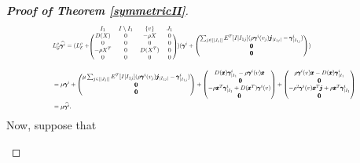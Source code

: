 \documentclass{amsart}
\theoremstyle{remark}
\begin{document}
\begin{proof}[\textbf{Proof of Theorem \ref{symmetricII}}]
\begin{equation*}
\resizebox{ 0.8\textwidth}{!} 
{$\begin{aligned}
&L_{\mathcal{G}}^{\rho}\widehat{\pmb{\gamma}^{i}}=(L_{\mathcal{E}}^{\rho}+
\begin{blockarray}{cccc}
I_{1} & I\setminus I_{1}&\{v\}&J_{1}\\
\begin{block}{(cccc)}
 D(X)  & 0 & -\rho X & 0\\
 0  & 0 & 0 & 0\\
  -\rho X^{T} & 0 &D(X^{T})  & 0 \\
 0 & 0 & 0 & 0 \\
\end{block}
\end{blockarray}\,)(\pmb{\gamma}^{i}+
\begin{pmatrix}
\sum_{j\in [|J_{1}|]} E^{T}[I|I_{1j}](\rho\pmb{\gamma}^{i}(v_{j})\pmb{j}_{|I_{1j}|}-\pmb{\gamma}^{i}_{|I_{1j}}) \\
 \pmb{0}\\
 \pmb{0}
\end{pmatrix})\\
&=\mu\pmb{\gamma}^{i}+
\begin{pmatrix}
\mu \sum_{j\in [|J_{1}|]} E^{T}[I|I_{1j}](\rho\pmb{\gamma}^{i}(v_{j})\pmb{j}_{|I_{1j}|}-\pmb{\gamma}^{i}_{|I_{1j}}) \\
 \pmb{0}\\
 \pmb{0}
\end{pmatrix}+
\begin{pmatrix}
D(\pmb{x})\pmb{\gamma}^{i}_{|I_{1}}-\rho\pmb{\gamma}^{i}(v)\pmb{x}\\\
  \pmb{0}\\
  -\rho \pmb{x}^{T}\pmb{\gamma}^{i}_{|I_{1}}+D(\pmb{x}^{T})\pmb{\gamma}^{i}(v) \\
  \pmb{0}
\end{pmatrix}+
\begin{pmatrix}
\rho\pmb{\gamma}^{i}(v)\pmb{x}-D(\pmb{x})\pmb{\gamma}^{i}_{|I_{1}}\\
  \pmb{0}\\
 -{\rho}^{2}\pmb{\gamma}^{i}(v)\pmb{x}^{T}\pmb{j}+ \rho \pmb{x}^{T}\pmb{\gamma}^{i}_{|I_{1}} \\
  \pmb{0}
\end{pmatrix}\\
&=\mu \widehat{\pmb{\gamma}^{i}}.
\end{aligned}$}
\end{equation*}
Now, suppose that
\begin{center}

\end{center}
\end{proof}
\end{document}
